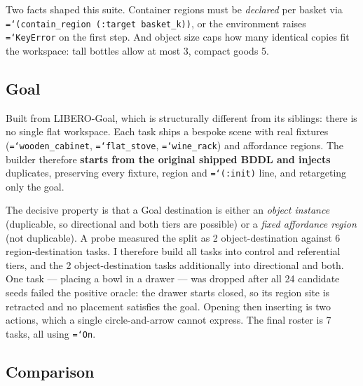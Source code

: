 \documentclass[11pt,a4paper]{article}
\newcommand{\code}[1]{\texttt{\small\hyphenchar\font=`\-\relax #1}}
\begin{document}
Two facts shaped this suite. Container regions must be \emph{declared} per
basket via \code{(contain\_region (:target basket\_k))}, or the environment
raises \code{KeyError} on the first step. And object size caps how many identical
copies fit the workspace: tall bottles allow at most 3, compact goods 5.

\subsection{Goal}

Built from LIBERO-Goal, which is structurally different from its siblings: there
is no single flat workspace. Each task ships a bespoke scene with real fixtures
(\code{wooden\_cabinet}, \code{flat\_stove}, \code{wine\_rack}) and affordance
regions. The builder therefore \textbf{starts from the original shipped BDDL and
injects} duplicates, preserving every fixture, region and \code{(:init)} line,
and retargeting only the goal.

The decisive property is that a Goal destination is either an \emph{object
instance} (duplicable, so directional and both tiers are possible) or a
\emph{fixed affordance region} (not duplicable). A probe measured the split as 2
object-destination against 6 region-destination tasks. I therefore build all
tasks into control and referential tiers, and the 2 object-destination tasks
additionally into directional and both. One task --- placing a bowl in a drawer
--- was dropped after all 24 candidate seeds failed the positive oracle: the
drawer starts closed, so its region site is retracted and no placement satisfies
the goal. Opening then inserting is two actions, which a single circle-and-arrow
cannot express. The final roster is 7 tasks, all using \code{On}.

\subsection{Comparison}
\end{document}

